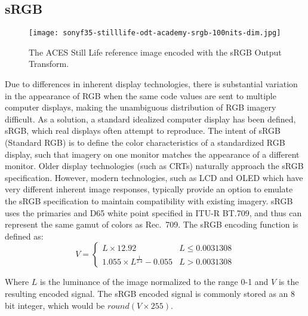 \subsection{sRGB}%
\label{subsec:srgb}

\begin{figure}[H]
    \texttt{[image: sonyf35-stilllife-odt-academy-srgb-100nits-dim.jpg]}
    \caption{
        The ACES Still Life reference image encoded with the sRGB Output Transform.\newline
        \ccCopyrightAmpas
    }%
    \label{fig:odt-academy-srgb-100nits-dim}
\end{figure}

Due to differences in inherent display technologies, there is substantial variation in the appearance of RGB when the same code values are sent to multiple computer displays, making the unambiguous distribution of RGB imagery difficult.
As a solution, a standard idealized computer display has been defined, sRGB, which real displays often attempt to reproduce.
The intent of sRGB (Standard RGB) is to define the color characteristics of a standardized RGB display, such that imagery on one monitor matches the appearance of a different monitor.
Older display technologies (such as CRTs) naturally approach the sRGB specification.
However, modern technologies, such as LCD and OLED which have very different inherent image responses, typically provide an option to emulate the sRGB specification to maintain compatibility with existing imagery.
\ccPar{}
sRGB uses the primaries and D65 white point specified in ITU-R BT.709, and thus can represent the same gamut of colors as Rec.~709.
\ccPar{}
The sRGB encoding function is defined as:
\begin{equation}
    V =
    \begin{cases}
        L \times 12.92 & L\leq 0.0031308 \\
        1.055 \times L^{\frac{1}{2.4}} - 0.055 & L > 0.0031308
    \end{cases}
\end{equation}

Where \(L\) is the luminance of the image normalized to the range 0-1 and \(V\) is the resulting encoded signal.
The sRGB encoded signal is commonly stored as an 8 bit integer, which would be \(round(V \times 255)\).

\begin{figure}[H]
    \label{fig:srgb-oetf}
\end{figure}

